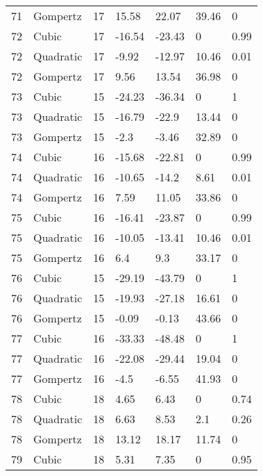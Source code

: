 \documentclass[11pt]{article}
\begin{document}
\begin{center}
\begin{longtable}{lllllll}
    71  & Gompertz  & 17              & 15.58   & 22.07   & 39.46   & 0    \\
    72  & Cubic     & 17              & -16.54  & -23.43  & 0       & 0.99 \\
    72  & Quadratic & 17              & -9.92   & -12.97  & 10.46   & 0.01 \\
    72  & Gompertz  & 17              & 9.56    & 13.54   & 36.98   & 0    \\
    73  & Cubic     & 15              & -24.23  & -36.34  & 0       & 1    \\
    73  & Quadratic & 15              & -16.79  & -22.9   & 13.44   & 0    \\
    73  & Gompertz  & 15              & -2.3    & -3.46   & 32.89   & 0    \\
    74  & Cubic     & 16              & -15.68  & -22.81  & 0       & 0.99 \\
    74  & Quadratic & 16              & -10.65  & -14.2   & 8.61    & 0.01 \\
    74  & Gompertz  & 16              & 7.59    & 11.05   & 33.86   & 0    \\
    75  & Cubic     & 16              & -16.41  & -23.87  & 0       & 0.99 \\
    75  & Quadratic & 16              & -10.05  & -13.41  & 10.46   & 0.01 \\
    75  & Gompertz  & 16              & 6.4     & 9.3     & 33.17   & 0    \\
    76  & Cubic     & 15              & -29.19  & -43.79  & 0       & 1    \\
    76  & Quadratic & 15              & -19.93  & -27.18  & 16.61   & 0    \\
    76  & Gompertz  & 15              & -0.09   & -0.13   & 43.66   & 0    \\
    77  & Cubic     & 16              & -33.33  & -48.48  & 0       & 1    \\
    77  & Quadratic & 16              & -22.08  & -29.44  & 19.04   & 0    \\
    77  & Gompertz  & 16              & -4.5    & -6.55   & 41.93   & 0    \\
    78  & Cubic     & 18              & 4.65    & 6.43    & 0       & 0.74 \\
    78  & Quadratic & 18              & 6.63    & 8.53    & 2.1     & 0.26 \\
    78  & Gompertz  & 18              & 13.12   & 18.17   & 11.74   & 0    \\
    79  & Cubic     & 18              & 5.31    & 7.35    & 0       & 0.95 \\

\end{longtable}
\end{center}
\end{document}
